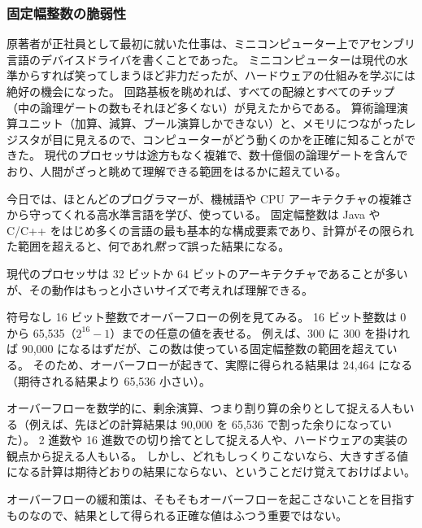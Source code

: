 \documentclass[uplatex]{jsarticle}
\def\label#1{}%
\begin{document}
\subsubsection{固定幅整数の脆弱性}\label{subsec:ch9-fixed-width-integer}

原著者が正社員として最初に就いた仕事は、ミニコンピューター上でアセンブリ言語のデバイスドライバを書くことであった。
ミニコンピューターは現代の水準からすれば笑ってしまうほど非力だったが、ハードウェアの仕組みを学ぶには絶好の機会になった。
回路基板を眺めれば、すべての配線とすべてのチップ（中の論理ゲートの数もそれほど多くない）が見えたからである。
算術論理演算ユニット（加算、減算、ブール演算しかできない）と、メモリにつながったレジスタが目に見えるので、コンピューターがどう動くのかを正確に知ることができた。
現代のプロセッサは途方もなく複雑で、数十億個の論理ゲートを含んでおり、人間がざっと眺めて理解できる範囲をはるかに超えている。

今日では、ほとんどのプログラマーが、機械語や CPU アーキテクチャの複雑さから守ってくれる高水準言語を学び、使っている。
固定幅整数は Java や C/C++ をはじめ多くの言語の最も基本的な構成要素であり、計算がその限られた範囲を超えると、何であれ\emph{黙って}誤った結果になる。

現代のプロセッサは 32 ビットか 64 ビットのアーキテクチャであることが多いが、その動作はもっと小さいサイズで考えれば理解できる。

\begin{exa}[16 ビット符号なし整数のオーバーフロー]\label{exa:ch9-overflow-300x300}
符号なし 16 ビット整数でオーバーフローの例を見てみる。
16 ビット整数は 0 から 65,535（$2^{16}-1$）までの任意の値を表せる。
例えば、300 に 300 を掛ければ 90,000 になるはずだが、この数は使っている固定幅整数の範囲を超えている。
そのため、オーバーフローが起きて、実際に得られる結果は 24,464 になる（期待される結果より 65,536 小さい）。
\end{exa}

オーバーフローを数学的に、剰余演算、つまり割り算の余りとして捉える人もいる（例えば、先ほどの計算結果は 90,000 を 65,536 で割った余りになっていた）。
2 進数や 16 進数での切り捨てとして捉える人や、ハードウェアの実装の観点から捉える人もいる。
しかし、どれもしっくりこないなら、大きすぎる値になる計算は期待どおりの結果にならない、ということだけ覚えておけばよい。

\begin{rem}[オーバーフローした値そのものは重要でない]\label{rem:ch9-overflow-value-unimportant}
オーバーフローの緩和策は、そもそもオーバーフローを起こさないことを目指すものなので、結果として得られる正確な値はふつう重要ではない。
\end{rem}
\end{document}
